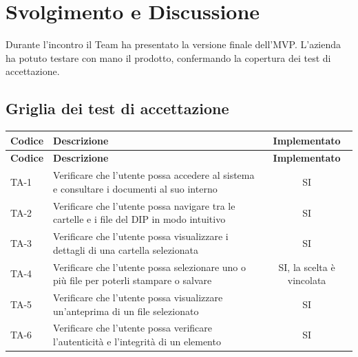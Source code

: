 \documentclass[a4paper,12pt]{article}
\begin{document}
\section{Svolgimento e Discussione}

Durante l'incontro il Team ha presentato la versione finale dell'MVP. L'azienda
ha potuto testare con mano il prodotto, confermando la copertura dei
test di accettazione.

\subsection{Griglia dei test di accettazione}
\renewcommand{\arraystretch}{1.2}
\begin{longtable}{|p{1.5cm}|p{8.5cm}|c|}
    \hline
    \rowcolor{zpusgreen!30}
    \textbf{Codice} & \textbf{Descrizione}                                                                                                     & \textbf{Implementato}      \\
    \hline
    \endfirsthead
    \rowcolor{zpusgreen!30}
    \textbf{Codice} & \textbf{Descrizione}                                                                                                     & \textbf{Implementato}      \\
    \hline
    \endhead
    TA-1            & Verificare che l'utente possa accedere al sistema e consultare i documenti al suo interno                                & SI                         \\
    \hline
    TA-2            & Verificare che l'utente possa navigare tra le cartelle e i file del DIP in modo intuitivo                                & SI                         \\
    \hline
    TA-3            & Verificare che l'utente possa visualizzare i dettagli di una cartella selezionata                                        & SI                         \\
    \hline
    TA-4            & Verificare che l'utente possa selezionare uno o più file per poterli stampare o salvare                                  & SI, la scelta è vincolata  \\
    \hline
    TA-5            & Verificare che l'utente possa visualizzare un'anteprima di un file selezionato                                           & SI                         \\
    \hline
    TA-6            & Verificare che l'utente possa verificare l'autenticità e l'integrità di un elemento                                      & SI                         \\

\end{longtable}
\end{document}

